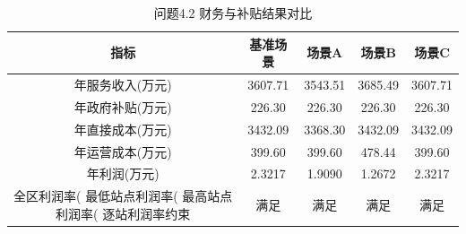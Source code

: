 \begin{table}[htbp]
\centering
\caption{问题4.2 财务与补贴结果对比}
\begin{tabular}{|c|c|c|c|c|}
\hline
指标 & 基准场景 & 场景A & 场景B & 场景C \\
\hline
年服务收入(万元) & 3607.71 & 3543.51 & 3685.49 & 3607.71 \\
年政府补贴(万元) & 226.30 & 226.30 & 226.30 & 226.30 \\
年直接成本(万元) & 3432.09 & 3368.30 & 3432.09 & 3432.09 \\
年运营成本(万元) & 399.60 & 399.60 & 478.44 & 399.60 \\
年利润(万元) & 2.3217 & 1.9090 & 1.2672 & 2.3217 \\
全区利润率(%
最低站点利润率(%
最高站点利润率(%
逐站利润率约束 & 满足 & 满足 & 满足 & 满足 \\
\hline
\end{tabular}
\end{table}

